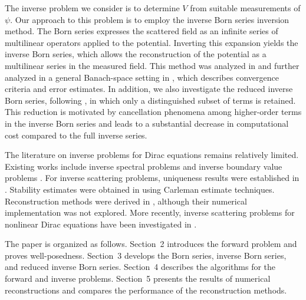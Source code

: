 \documentclass[12pt,reqno]{amsart}
\begin{document}
The inverse problem we consider is to determine $V$ from suitable measurements of $\psi$. Our approach to this problem is to employ the inverse Born series inversion method. 
The Born series expresses the scattered field as an infinite series of multilinear operators applied to the potential. Inverting this expansion yields the inverse Born series, which allows the reconstruction of the potential as a multilinear series in the measured field. This method was analyzed in \cite{2008shari} and further analyzed in a general Banach-space setting in \cite{hoskinsAnalysisInverseBorn2022}, which describes convergence criteria and error estimates.
 In addition, we also investigate the reduced inverse Born series, following \cite{2022reduced}, in which only a distinguished subset of terms is retained. This reduction is motivated by cancellation phenomena among higher-order terms in the inverse Born series and leads to a substantial decrease in computational cost compared to the full inverse series.
 
The literature on inverse problems for Dirac equations remains relatively limited.
Existing works include inverse spectral problems
\cite{watsonInverseSpectralProblems1999,mykytyukInverseSpectralProblems2012}
and inverse boundary value problems
\cite{saloInverseProblemsPartial2010,kurylevInverseProblemsIndex2009}.
For inverse scattering problems, uniqueness results were established in
\cite{hachemPartialbarApproachInverse1995, isozakiInverseScatteringTheory1997}.
Stability estimates were obtained in
\cite{kawamotoDeterminationElectromagneticPotential2012}
using Carleman estimate techniques. Reconstruction methods
were derived in
\cite{grebertInverseScatteringDirac1992, belishevInverseProblemOnedimensional2014},
although their numerical implementation was not explored. More recently, inverse
scattering problems for nonlinear Dirac equations have been investigated in
\cite{yiBoundedTimeInverse2025}.

The paper is organized as follows. Section~2 introduces the forward problem and proves well-posedness. Section~3 develops the Born series, inverse Born series, and reduced inverse Born series. Section~4 describes the algorithms for the forward and inverse problems. Section~5 presents the results of numerical reconstructions and compares the performance of the reconstruction methods. 
\end{document}
